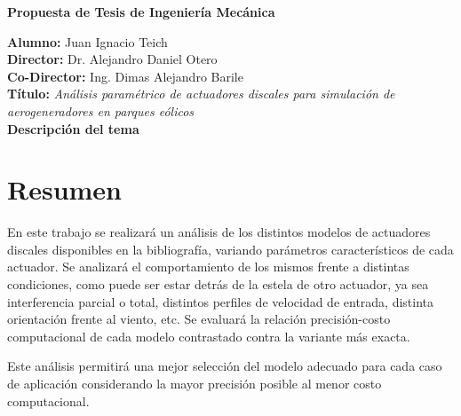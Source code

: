 \documentclass{article}
\newcommand{\thetitle}{Propuesta de Tesis de Ingeniería Mecánica}
\newcommand{\theauthorJT}{Juan Ignacio Teich}
\newcommand{\thedate}{Octubre 2023}
\newcommand{\thesisname}{Análisis paramétrico de actuadores discales para simulación de aerogeneradores en parques eólicos}
\numberwithin{equation}{subsection}
\begin{document}


\begin{center}
	{\bfseries \LARGE \thetitle}
\end{center}

\noindent \textbf{Alumno:} Juan Ignacio Teich\\
\textbf{Director:} Dr. Alejandro Daniel Otero\\
\textbf{Co-Director:} Ing. Dimas Alejandro Barile\\
\textbf{Título:} \textit{\thesisname}\\

\textbf{\Large Descripción del tema}
\section{Resumen}
En este trabajo se realizará un análisis de los distintos modelos de actuadores discales disponibles en la bibliografía, variando parámetros característicos de cada actuador. Se analizará el comportamiento de los mismos frente a distintas condiciones, como puede ser estar detrás de la estela de otro actuador, ya sea interferencia parcial o total, distintos perfiles de velocidad de entrada, distinta orientación frente al viento, etc. Se evaluará la relación precisión-costo computacional de cada modelo contrastado contra la variante más exacta.


Este análisis permitirá una mejor selección del modelo adecuado para cada caso de aplicación considerando la mayor precisión posible al menor costo computacional.
\end{document}
